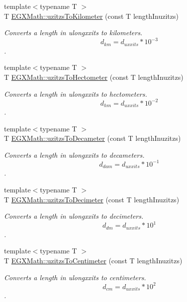 \begin{DoxyCompactItemize}
{\footnotesize template$<$typename T $>$ }\\T \mbox{\hyperlink{group___e_g_x_math-_conversions-_length_conversions-uzitzs-_s_i_ga43a39eb66f3250c955de8fb2beff314c}{E\+G\+X\+Math\+::uzitzs\+To\+Kilometer}} (const T length\+Inuzitzs)
\begin{DoxyCompactList}\small\item\em Converts a length in ulongxxits to kilometers. \[ d_{km}=d_{uxxits} * 10^{-3} \]. \end{DoxyCompactList}\item 
{\footnotesize template$<$typename T $>$ }\\T \mbox{\hyperlink{group___e_g_x_math-_conversions-_length_conversions-uzitzs-_s_i_gabc1973b8ea47e021bd981f94ac1f254d}{E\+G\+X\+Math\+::uzitzs\+To\+Hectometer}} (const T length\+Inuzitzs)
\begin{DoxyCompactList}\small\item\em Converts a length in ulongxxits to hectometers. \[ d_{hm}=d_{uxxits} * 10^{-2} \]. \end{DoxyCompactList}\item 
{\footnotesize template$<$typename T $>$ }\\T \mbox{\hyperlink{group___e_g_x_math-_conversions-_length_conversions-uzitzs-_s_i_ga62dcf7a675d92ce74d56e67f2fed7ace}{E\+G\+X\+Math\+::uzitzs\+To\+Decameter}} (const T length\+Inuzitzs)
\begin{DoxyCompactList}\small\item\em Converts a length in ulongxxits to decameters. \[ d_{dam}=d_{uxxits} * 10^{-1} \]. \end{DoxyCompactList}\item 
{\footnotesize template$<$typename T $>$ }\\T \mbox{\hyperlink{group___e_g_x_math-_conversions-_length_conversions-uzitzs-_s_i_ga178324834750df4df1026a8900fadbcc}{E\+G\+X\+Math\+::uzitzs\+To\+Decimeter}} (const T length\+Inuzitzs)
\begin{DoxyCompactList}\small\item\em Converts a length in ulongxxits to decimeters. \[ d_{dm}=d_{uxxits} * 10^{1} \]. \end{DoxyCompactList}\item 
{\footnotesize template$<$typename T $>$ }\\T \mbox{\hyperlink{group___e_g_x_math-_conversions-_length_conversions-uzitzs-_s_i_ga1fb15b72a000d43348190004a49ed7bc}{E\+G\+X\+Math\+::uzitzs\+To\+Centimeter}} (const T length\+Inuzitzs)
\begin{DoxyCompactList}\small\item\em Converts a length in ulongxxits to centimeters. \[ d_{cm}=d_{uxxits} * 10^{2} \]. \end{DoxyCompactList}\item 

\end{DoxyCompactItemize}
